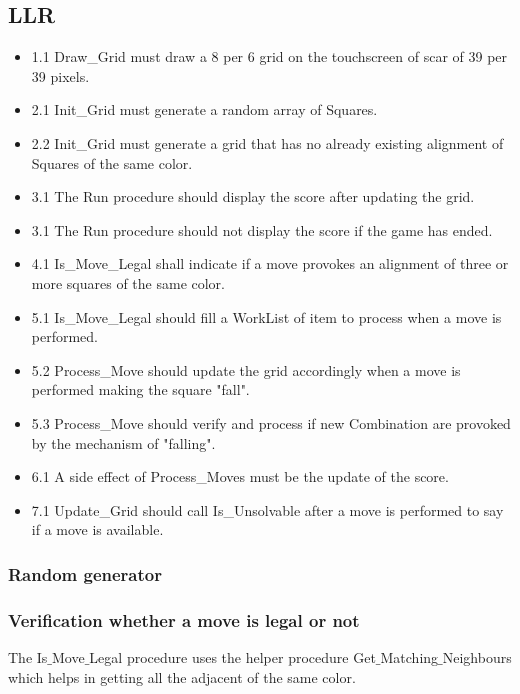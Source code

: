 \subsection{LLR}
\begin{itemize}
    \item 1.1 Draw\_Grid must draw a 8 per 6 grid on the touchscreen of scar of
        39 per 39 pixels.
    \item 2.1 Init\_Grid must generate a random array of Squares.
    \item 2.2 Init\_Grid must generate a grid that has no already existing
        alignment of Squares of the same color.
    \item 3.1 The Run procedure should display the score after updating the grid.
    \item 3.1 The Run procedure should not display the score if the game has
        ended.
    \item 4.1 Is\_Move\_Legal shall indicate if a move provokes an alignment of
        three or more squares of the same color.
    \item 5.1 Is\_Move\_Legal should fill a WorkList of item to process when a
        move is performed.
    \item 5.2 Process\_Move should update the grid accordingly when a move is
        performed making the square "fall".
    \item 5.3 Process\_Move should verify and process if new Combination are
        provoked by the mechanism of "falling".
    \item 6.1 A side effect of Process\_Moves must be the update of the score.
    \item 7.1 Update\_Grid should call Is\_Unsolvable after a move is performed
        to say if a move is available.
\end{itemize}

\subsubsection{Random \sq generator}



\subsubsection{Verification whether a move is legal or not}

The Is$\_$Move$\_$Legal procedure uses the helper procedure Get$\_$Matching$\_$Neighbours which helps in getting all the adjacent \sqs of the same color.

